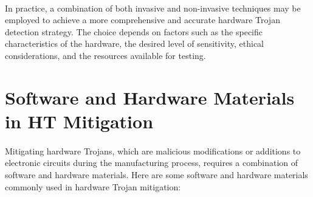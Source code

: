 \paragraph*{}
In practice, a combination of both invasive and non-invasive techniques may be employed to achieve a more comprehensive and accurate hardware Trojan detection strategy. The choice depends on factors such as the specific characteristics of the hardware, the desired level of sensitivity, ethical considerations, and the resources available for testing.

\section{Software and Hardware Materials in HT Mitigation}
\paragraph*{}
Mitigating hardware Trojans, which are malicious modifications or additions to electronic circuits during the manufacturing process, requires a combination of software and hardware materials. Here are some software and hardware materials commonly used in hardware Trojan mitigation:
